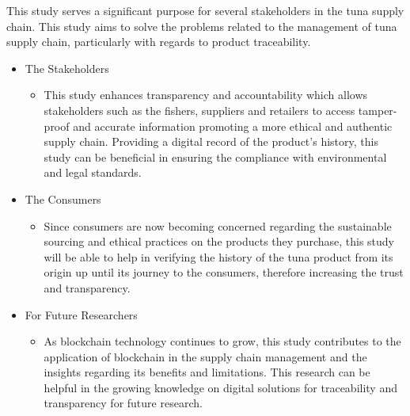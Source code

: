 This study serves a significant purpose for several stakeholders in the tuna supply chain. This study aims to solve the problems related to the management of tuna supply chain, particularly with regards to product traceability.
\begin{itemize}
	\item The Stakeholders 
	\begin{itemize}
		\item This study enhances transparency and accountability which allows stakeholders  such as the fishers, suppliers and retailers to access tamper-proof and accurate information promoting a more ethical and authentic supply chain. Providing a digital record of the product’s history, this study can be beneficial in ensuring the compliance with environmental and legal standards.
	\end{itemize}
\end{itemize}
\begin{itemize}
	\item The Consumers
	\begin{itemize}
		\item Since consumers are now becoming concerned regarding the sustainable sourcing and ethical practices on the products they purchase, this study will be able to help in verifying the history of the tuna product from its origin up until its journey to the consumers, therefore increasing the trust and transparency. 
	\end{itemize}
\end{itemize}
\begin{itemize}
	\item For Future Researchers
	\begin{itemize}
		\item As blockchain technology continues to grow, this study contributes to the application of blockchain in the supply chain management and the insights regarding its benefits and limitations. This research can be helpful in the growing knowledge on digital solutions for traceability and transparency for future research. 
	\end{itemize}
\end{itemize}

\begin{comment}
If applicable, describe possible commercialization and/or innovation in your research.
\end{comment}



